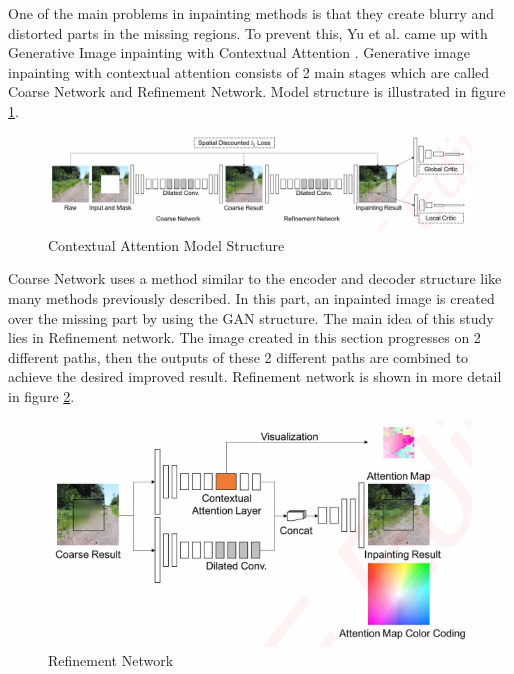 One of the main problems in inpainting methods is that they create blurry and distorted parts in the missing regions. To prevent this, Yu et al. came up with Generative Image inpainting with Contextual Attention \cite{generative_contextual}.
Generative image inpainting with contextual attention consists of 2 main stages which are called Coarse Network and Refinement Network. Model structure is illustrated in figure \ref{fig:contextual-structure}.

\begin{figure}[h]
    \centering
    \includegraphics[scale=0.4]{figures/chapter4/GenerativeOverview.PNG}
    \caption{Contextual Attention Model Structure}
    \label{fig:contextual-structure}
\end{figure}

Coarse Network uses a method similar to the encoder and decoder structure like many methods previously described. In this part, an inpainted image is created over the missing part by using the GAN structure. \newline
The main idea of this study lies in Refinement network. The image created in this section progresses on 2 different paths, then the outputs of these 2 different paths are combined to achieve the desired improved result. Refinement network is shown in more detail in figure \ref{fig:refinement-network}.

\begin{figure}[h]
    \centering
    \includegraphics[scale=0.85]{figures/chapter4/GenerativeAttention.PNG}
    \caption{Refinement Network}
    \label{fig:refinement-network}
\end{figure}

